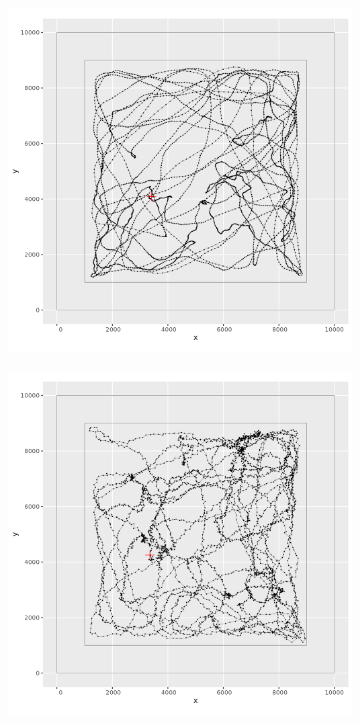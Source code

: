 \documentclass[11pt]{article}
\newcommand {\1}{\mathbb{1}}
\begin{document}
 
 \begin{figure}[H]
 	\centering
 	\begin{subfigure}{0.48\textwidth}
 		\centering
 		\includegraphics[scale=0.4]{images/simulation study/samples_rect_hf_ne_omega.png}
 		\caption{}
 	\end{subfigure}
 	\begin{subfigure}{0.48\textwidth}
 		\centering
 		\includegraphics[scale=0.4]{images/simulation study/samples_rect_hf_e_omega.png}

\end{subfigure}
\end{figure}
\end{document}
